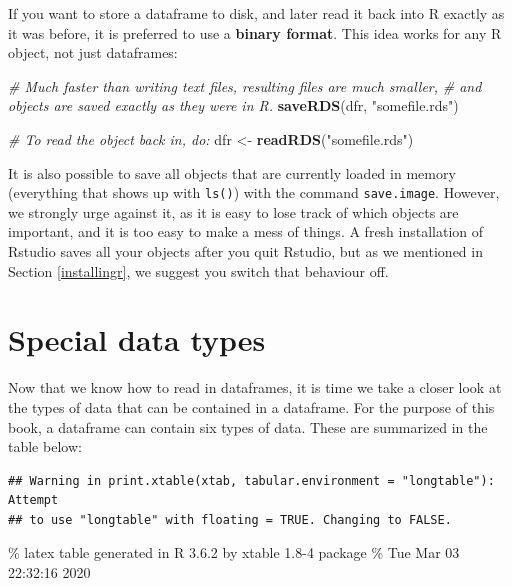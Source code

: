\documentclass[]{book}
\newenvironment{Shaded}{\begin{snugshade}}{\end{snugshade}}
\newcommand{\CommentTok}[1]{\textcolor[rgb]{0.56,0.35,0.01}{\textit{#1}}}
\newcommand{\KeywordTok}[1]{\textcolor[rgb]{0.13,0.29,0.53}{\textbf{#1}}}
\newcommand{\NormalTok}[1]{#1}
\newcommand{\StringTok}[1]{\textcolor[rgb]{0.31,0.60,0.02}{#1}}
\begin{document}
If you want to store a dataframe to disk, and later read it back into R exactly as it was before, it is preferred to use a \textbf{binary format}. This idea works for any R object, not just dataframes:

\begin{Shaded}
\begin{Highlighting}[]
\CommentTok{# Much faster than writing text files, resulting files are much smaller,}
\CommentTok{# and objects are saved exactly as they were in R.}
\KeywordTok{saveRDS}\NormalTok{(dfr, }\StringTok{"somefile.rds"}\NormalTok{)}

\CommentTok{# To read the object back in, do:}
\NormalTok{dfr <-}\StringTok{ }\KeywordTok{readRDS}\NormalTok{(}\StringTok{"somefile.rds"}\NormalTok{)}
\end{Highlighting}
\end{Shaded}

It is also possible to save all objects that are currently loaded in memory (everything that shows up with \texttt{ls()}) with the command \texttt{save.image}. However, we strongly urge against it, as it is easy to lose track of which objects are important, and it is too easy to make a mess of things. A fresh installation of Rstudio saves all your objects after you quit Rstudio, but as we mentioned in Section \ref{installingr}, we suggest you switch that behaviour off.

\hypertarget{special-data-types}{%
\section{Special data types}\label{special-data-types}}

Now that we know how to read in dataframes, it is time we take a closer look at the types of data that can be contained in a dataframe. For the purpose of this book, a dataframe can contain six types of data. These are summarized in the table below:

\begin{verbatim}
## Warning in print.xtable(xtab, tabular.environment = "longtable"): Attempt
## to use "longtable" with floating = TRUE. Changing to FALSE.
\end{verbatim}

\% latex table generated in R 3.6.2 by xtable 1.8-4 package
\% Tue Mar 03 22:32:16 2020
\end{document}
